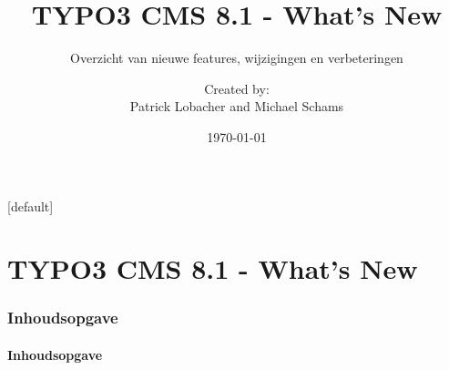 \documentclass[t]{beamer}
\title{TYPO3 CMS 8.1 - What's New}
\subtitle{Overzicht van nieuwe features, wijzigingen en verbeteringen}
\author{
	\centerline{Created by:}
	\centerline{Patrick Lobacher and Michael Schams}
}
\date{\today}
\begin{document}
\sharefont


\begingroup
	[default]
	\begin{frame}
		\titlepage
	\end{frame}
\endgroup


\section*{TYPO3 CMS 8.1 - What's New}
\begin{frame}[fragile]
	\frametitle{Inhoudsopgave}
	\framesubtitle{Inhoudsopgave}

	\tableofcontents

\end{frame}










\end{document}
